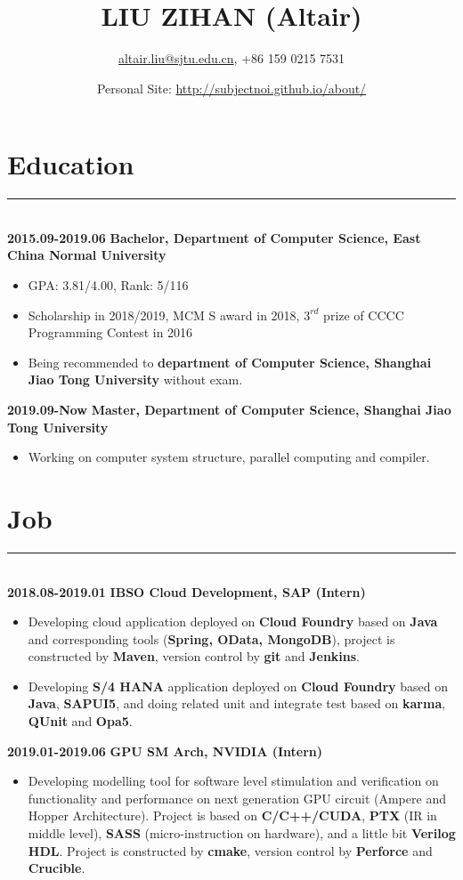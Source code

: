 \documentclass[a4paper]{article}
\title{LIU ZIHAN (Altair)}
\author{\url{altair.liu@sjtu.edu.cn}, +86 159 0215 7531}
\date{Personal Site: \url{http://subjectnoi.github.io/about/}}
\begin{document}
		\maketitle
		\section*{Education}
		\rule[1pt]{18cm}{0.01em}\\
		\textbf{2015.09-2019.06} \hfill \textbf{Bachelor, Department of Computer Science, East China Normal University}
		\begin{itemize}
		\item GPA: 3.81/4.00, Rank: 5/116
		\item Scholarship in 2018/2019, MCM S award in 2018, $ 3^{rd} $ prize of CCCC Programming Contest in 2016
		\item Being recommended to \textbf{department of Computer Science, Shanghai Jiao Tong University} without exam.
		\end{itemize}
		\textbf{2019.09-Now} \hfill \textbf{Master, Department of Computer Science, Shanghai Jiao Tong University}
		\begin{itemize}
		\item Working on computer system structure, parallel computing and compiler.
		\end{itemize}
		\section*{Job}
		\rule[1pt]{18cm}{0.01em}\\
		\textbf{2018.08-2019.01} \hfill \textbf{IBSO Cloud Development, SAP (Intern)}
		\begin{itemize}
		\item Developing cloud application deployed on \textbf{Cloud Foundry} based on \textbf{Java} and corresponding tools (\textbf{Spring, OData, MongoDB}), project is constructed by \textbf{Maven}, version control by \textbf{git} and \textbf{Jenkins}.
		\item Developing \textbf{S/4 HANA} application deployed on \textbf{Cloud Foundry} based on \textbf{Java}, \textbf{SAPUI5}, and doing related unit and integrate test based on \textbf{karma}, \textbf{QUnit} and \textbf{Opa5}.
		\end{itemize}
		\textbf{2019.01-2019.06} \hfill \textbf{GPU SM Arch, NVIDIA (Intern)}
		\begin{itemize}
		\item Developing modelling tool for software level stimulation and verification on functionality and performance on next generation GPU circuit (Ampere and Hopper Architecture). Project is based on \textbf{C/C++/CUDA}, \textbf{PTX} (IR in middle level), \textbf{SASS} (micro-instruction on hardware), and a little bit \textbf{Verilog HDL}. Project is constructed by \textbf{cmake}, version control by \textbf{Perforce} and \textbf{Crucible}.
		\end{itemize}
\end{document}
